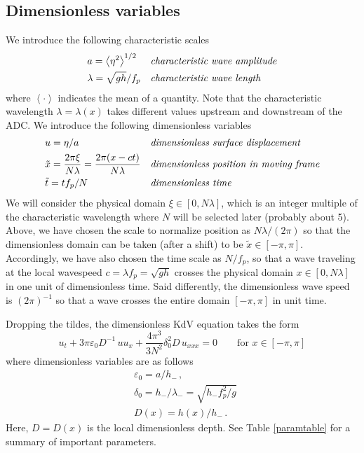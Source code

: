 \documentclass[11pt]{article}
\newcommand{\mean}[1]{\left< #1 \right>}
\newcommand{\eps}{\varepsilon}
\newcommand{\depth}{h}
\newcommand{\dup}{\depth_{-}}
\newcommand{\freqp}{f_p}
\newcommand{\lam}{\lambda}
\newcommand{\lamup}{\lam_{-}}
\newcommand{\lamfac}{N}
\newcommand{\amp}{a}
\newcommand{\epsup}{\eps_0}
\newcommand{\delup}{\delta_0}
\newcommand{\drat}{D}
\begin{document}
\subsection{Dimensionless variables}
\label{nondim}
We introduce the following characteristic scales
\begin{align}
\label{ampdefn}
&\amp = \mean{\eta^2}^{1/2} 
&&\mbox{\em characteristic wave amplitude} \\
\label{lamdefn}
&\lam = \sqrt{g \depth} / \freqp
&&\mbox{\em characteristic wave length}
\end{align}
where $\mean{\cdot}$ indicates the mean of a quantity. Note that the characteristic wavelength $\lam = \lam(x)$ takes different values upstream and downstream of the ADC.
We introduce the following dimensionless variables
\begin{align}
&u = \eta/\amp
&&\mbox{\em dimensionless surface displacement} \\
&\tilde{x} = \frac{2 \pi \xi}{\lamfac \lam} = \frac{2 \pi (x-ct)}{\lamfac \lam}
&&\mbox{\em dimensionless position in moving frame} \\
& \tilde{t} = t \freqp / \lamfac
&&\mbox{\em dimensionless time} \\
\end{align}
We will consider the physical domain $\xi \in [0, \lamfac \lam]$, which is an integer multiple of the characteristic wavelength where $\lamfac$ will be selected later (probably about 5). Above, we have chosen the scale to normalize position as $\lamfac \lam/(2\pi)$ so that the dimensionless domain can be taken (after a shift) to be $\tilde{x} \in [-\pi,\pi]$. Accordingly, we have also chosen the time scale as $\lamfac/\freqp$, so that a wave traveling at the local wavespeed $c = \lam \freqp = \sqrt{g \depth}$ crosses the physical domain $x \in [0, \lamfac \lam]$ in one unit of dimensionless time. Said differently, the dimensionless wave speed is $(2 \pi)^{-1}$ so that a wave crosses the entire domain $[-\pi,\pi]$ in unit time.

Dropping the tildes, the dimensionless KdV equation takes the form
\begin{equation}
u_t + {3 \pi} \epsup \drat^{-1} \, u u_x + \frac{4 \pi^3}{3 \lamfac^2} \delup^2 \drat \, u_{xxx} = 0
\qquad \text{for } x \in [-\pi,\pi]
\end{equation}
where dimensionless variables are as follows
\begin{align}
&\epsup = \amp/\dup \, , \\
&\delup = \dup/\lamup = \sqrt{\dup \freqp^2/g} \, \\
&\drat(x) = {\depth(x)}/{\dup} \, .
\end{align}
Here, $\drat = \drat(x)$ is the local dimensionless depth. See Table \ref{paramtable} for a summary of important parameters.
\end{document}
